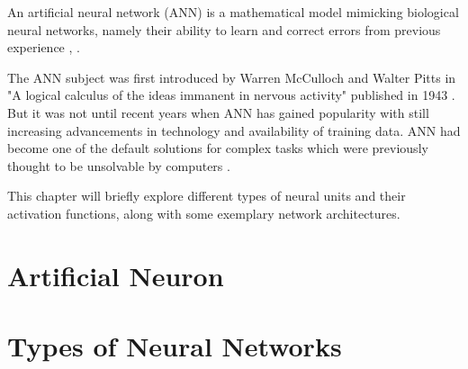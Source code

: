 An artificial neural network (ANN) is a mathematical model mimicking biological neural networks,
namely their ability to learn and correct errors from previous experience \cite{designimplentationcc}, \cite{bengio2017deep}.

The ANN subject was first introduced by Warren McCulloch and Walter Pitts in "A logical calculus of the ideas immanent in nervous activity" published in 1943 \cite{mcculloch1943logical}. But it was not until recent years when ANN has gained popularity with still increasing advancements in technology and availability of training data. ANN had become one of the default solutions for complex tasks which were previously thought to be unsolvable by computers \cite{neural2016krishtopa}.

This chapter will briefly explore different types of neural units and their activation functions, along with some exemplary network architectures.

\section{Artificial Neuron}

\section{Types of Neural Networks}

